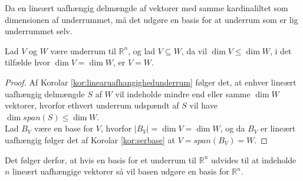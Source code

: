 Da en lineært uafhængig delmængde af vektorer med samme kardinaliltet som dimensionen af underrummet, må det udgøre en basis for at underrum som er lig underrummet selv.
\begin{stn}
Lad $V$ og $W$ være underrum til $\mathds{R}^n$, og lad $V \subseteq W$, da vil $\dim{V} \leq \dim{W}$, i det tilfælde hvor $\dim{V}=\dim{W}$, er $V=W$.
\label{stn:dimunderrum}
\end{stn}
\begin{proof}
Af Korolar \ref{kor:linearuafhangighedunderrum} følger det, at enhver lineært uafhængig delmængde $S$ af $W$ vil indeholde mindre end eller samme $\dim{W}$ vektorer, hvorfor ethvert underrum udspændt af $S$ vil have $\dim{span(S)} \leq \dim{W}$.
\\%
Lad $B_V$ være en base for $V$, hvorfor $|B_V| = \dim{V} = \dim{W}$, og da $B_V$ er lineært uafhængig følger det af Korolar \ref{kor:serbase} at $V = span(B_V) = W$.
\end{proof}
Det følger derfor, at hvis en basis for et underrum til $\mathds{R}^n$ udvides til at indeholde $n$ lineært uafhængige vektorer så vil basen udgøre en basis for $\mathds{R}^n$.